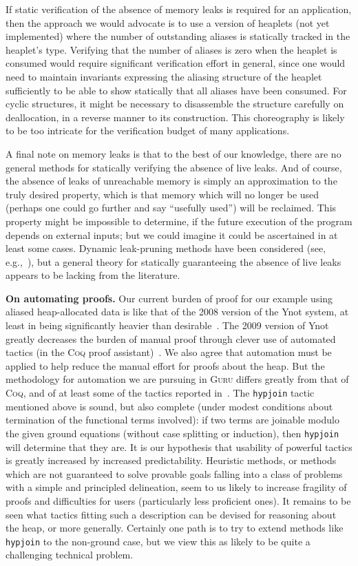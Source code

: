 \documentclass[9pt,natbib]{sigplanconf}
\begin{document}
If static verification of the absence of memory leaks is required for
an application, then the approach we would advocate is to use a
version of heaplets (not yet implemented) where the number of
outstanding aliases is statically tracked in the heaplet's type.
Verifying that the number of aliases is zero when the heaplet is
consumed would require significant verification effort in general,
since one would need to maintain invariants expressing the aliasing
structure of the heaplet sufficiently to be able to show statically
that all aliases have been consumed.  For cyclic structures, it might
be necessary to disassemble the structure carefully on deallocation,
in a reverse manner to its construction.  This choreography is
likely to be too intricate for the verification budget of many
applications.

A final note on memory leaks is that to the best of our knowledge,
there are no general methods for statically verifying the absence of
live leaks.  And of course, the absence of leaks of unreachable memory
is simply an approximation to the truly desired property, which is
that memory which will no longer be used (perhaps one could go further
and say ``usefully used'') will be reclaimed.  This property might be
impossible to determine, if the future execution of the program
depends on external inputs; but we could imagine it could be
ascertained in at least some cases.  Dynamic leak-pruning methods have
been considered (see, e.g.,~\cite{bond+09}), but a general theory for
statically guaranteeing the absence of live leaks appears to be
lacking from the literature.

\textbf{On automating proofs.} Our current burden of proof for our
example using aliased heap-allocated data is like that of the 2008
version of the Ynot system, at least in being significantly heavier
than desirable~\cite{nanevski+08}.  The 2009 version of Ynot greatly
decreases the burden of manual proof through clever use of automated
tactics (in the \textsc{Coq} proof assistant)~\cite{ynot09}.  We also
agree that automation must be applied to help reduce the manual effort
for proofs about the heap.  But the methodology for automation we are
pursuing in \textsc{Guru} differs greatly from that of \textsc{Coq},
and of at least some of the tactics reported in~\cite{ynot09}.  The
\texttt{hypjoin} tactic mentioned above is sound, but also complete
(under modest conditions about termination of the functional terms
involved): if two terms are joinable modulo the given ground equations
(without case splitting or induction), then \texttt{hypjoin} will
determine that they are.  It is our hypothesis that usability of
powerful tactics is greatly increased by increased predictability.
Heuristic methods, or methods which are not guaranteed to solve
provable goals falling into a class of problems with a simple and
principled delineation, seem to us likely to increase fragility of
proofs and difficulties for users (particularly less proficient ones).
It remains to be seen what tactics fitting such a description can be
devised for reasoning about the heap, or more generally.  Certainly
one path is to try to extend methods like \texttt{hypjoin} to the
non-ground case, but we view this as likely to be quite a challenging
technical problem.
\end{document}
